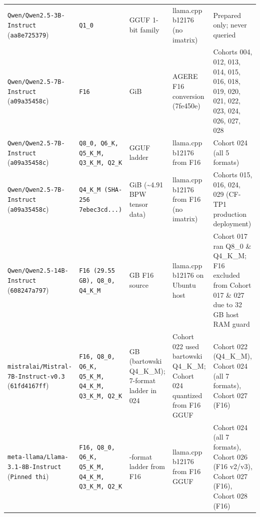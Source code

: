 {\begin{longtable}{@{}>{\raggedright\arraybackslash}p{3.0cm}>{\raggedright\arraybackslash}p{2.3cm}>{\raggedright\arraybackslash}p{2.2cm}>{\raggedright\arraybackslash}p{3.4cm}>{\raggedright\arraybackslash}p{3.6cm}@{}}
\texttt{Qwen/\allowbreak{}Qwen2.5-\allowbreak{}3B-\allowbreak{}Instruct} (\texttt{aa8e725379}) & \texttt{Q1\_0} & GGUF 1-\allowbreak{}bit family & llama.cpp b12176 (no imatrix) & Prepared only; never queried \\[2pt]
\texttt{Qwen/\allowbreak{}Qwen2.5-\allowbreak{}7B-\allowbreak{}Instruct} (\texttt{a09a35458c}) & \texttt{F16} & 14.191 GiB & AGERE F16 conversion (7fe450e) & Cohorts 004, 012, 013, 014, 015, 016, 018, 019, 020, 021, 022, 023, 024, 026, 027, 028 \\[2pt]
\texttt{Qwen/\allowbreak{}Qwen2.5-\allowbreak{}7B-\allowbreak{}Instruct} (\texttt{a09a35458c}) & \texttt{Q8\_0, Q6\_K, Q5\_K\_M, Q3\_K\_M, Q2\_K} & GGUF ladder & llama.cpp b12176 from F16 & Cohort 024 (all 5 formats) \\[2pt]
\texttt{Qwen/\allowbreak{}Qwen2.5-\allowbreak{}7B-\allowbreak{}Instruct} (\texttt{a09a35458c}) & \texttt{Q4\_K\_M (SHA-\allowbreak{}256 7ebec3cd...)} & 4.361 GiB (\textasciitilde{}4.91 BPW tensor data) & llama.cpp b12176 from F16 (no imatrix) & Cohorts 015, 016, 024, 029 (CF-\allowbreak{}TP1 production deployment) \\[2pt]
\texttt{Qwen/\allowbreak{}Qwen2.5-\allowbreak{}14B-\allowbreak{}Instruct} (\texttt{608247a797}) & \texttt{F16 (29.55 GB), Q8\_0, Q4\_K\_M} & 29.55 GB F16 source & llama.cpp b12176 on Ubuntu host & Cohort 017 ran Q8\_0 \& Q4\_K\_M; F16 excluded from Cohort 017 \& 027 due to 32 GB host RAM guard \\[2pt]
\texttt{mistralai/\allowbreak{}Mistral-\allowbreak{}7B-\allowbreak{}Instruct-\allowbreak{}v0.3} (\texttt{61fd4167ff}) & \texttt{F16, Q8\_0, Q6\_K, Q5\_K\_M, Q4\_K\_M, Q3\_K\_M, Q2\_K} & 4.37 GB (bartowski Q4\_K\_M); 7-\allowbreak{}format ladder in 024 & Cohort 022 used bartowski Q4\_K\_M; Cohort 024 quantized from F16 GGUF & Cohort 022 (Q4\_K\_M), Cohort 024 (all 7 formats), Cohort 027 (F16) \\[2pt]
\texttt{meta-\allowbreak{}llama/\allowbreak{}Llama-\allowbreak{}3.1-\allowbreak{}8B-\allowbreak{}Instruct} (\texttt{Pinned thi}) & \texttt{F16, Q8\_0, Q6\_K, Q5\_K\_M, Q4\_K\_M, Q3\_K\_M, Q2\_K} & 7-\allowbreak{}format ladder from F16 & llama.cpp b12176 from F16 GGUF & Cohort 024 (all 7 formats), Cohort 026 (F16 v2/\allowbreak{}v3), Cohort 027 (F16), Cohort 028 (F16) \\[2pt]
\end{longtable}
}